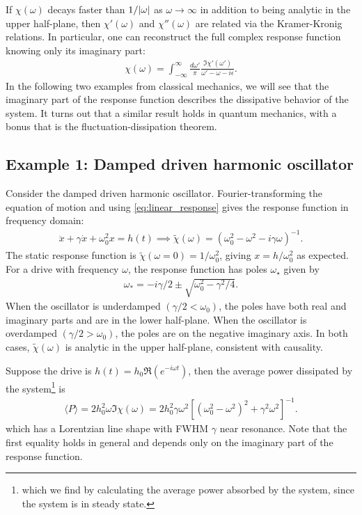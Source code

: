 \documentclass[reprint,
nofootinbib,
amsmath,amssymb,
aps]{revtex4-1}
\newcommand{\f}[2]{\frac{#1}{#2}}
\begin{document}
If $\chi(\omega)$ decays faster than $1/\abs{\omega}$ as $\omega \to \infty$ in addition to being analytic in the upper half-plane, then $\chi'(\omega)$ and $\chi''(\omega)$ are related via the Kramer-Kronig relations. In particular, one can reconstruct the full complex response function knowing only its imaginary part:
\begin{align*}
\chi(\omega) = \int_{-\infty}^\infty \f{d\omega'}{\pi} \f{\Im \chi'(\omega')}{\omega' - \omega - i\epsilon}.
\end{align*}
In the following two examples from classical mechanics, we will see that the imaginary part of the response function describes the dissipative behavior of the system. It turns out that a similar result holds in quantum mechanics, with a bonus that is the fluctuation-dissipation theorem.

\subsection{Example 1: Damped driven harmonic oscillator}
Consider the damped driven harmonic oscillator. Fourier-transforming the equation of motion and using  \eqref{eq:linear_response} gives the response function in frequency domain:
\begin{align*}
\ddot{x} + \gamma \dot{x} + \omega_0^2 x = h(t) \implies 
\tilde{\chi}(\omega) = ( \omega_0^2 - \omega^2 - i \gamma \omega)^{-1}.
\end{align*}
The static response function is $\tilde{\chi}(\omega = 0) = 1/\omega_0^2$, giving $x = h/\omega_0^2$ as expected. For a drive with frequency $\omega$, the response function has poles $\omega_\star$ given by 
\begin{align*}
\omega_* = -i\gamma/2 \pm \sqrt{\omega_0^2  - \gamma^2/4}.
\end{align*}
When the oscillator is underdamped $(\gamma/2 < \omega_0)$, the poles have both real and imaginary parts and are in the lower half-plane. When the oscillator is overdamped $(\gamma/2 > \omega_0)$, the poles are on the negative imaginary axis. In both cases, $\tilde{\chi}(\omega)$ is analytic in the upper half-plane, consistent with causality. 

Suppose the drive is $h(t) = h_0 \Re(e^{-i\omega t})$,  then the average power dissipated by the system\footnote{which we find by calculating the average power absorbed by the system, since the system is in steady state.} is 
\begin{align*}
\langle P \rangle = 2h_0^2 \omega \Im\chi(\omega) = 2h_0^2  \gamma \omega^2 [(\omega_0^2 - \omega^2)^2 + \gamma^2 \omega^2]^{-1}.
\end{align*}
which has a Lorentzian line shape with FWHM $\gamma$ near resonance. Note that the first equality holds in general and depends only on the imaginary part of the response function. 
\end{document}
